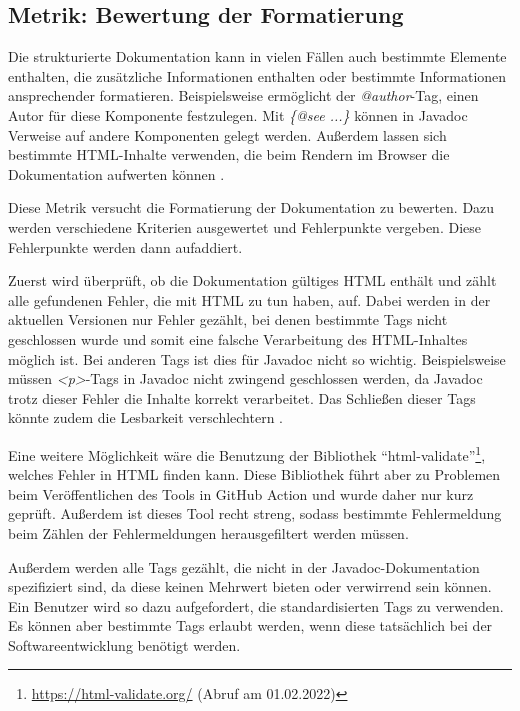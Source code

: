  \subsection{Metrik: Bewertung der Formatierung}\label{chapter:metric_formatting}
 
Die strukturierte Dokumentation kann in vielen Fällen auch bestimmte Elemente enthalten, die zusätzliche Informationen enthalten oder bestimmte Informationen ansprechender formatieren. Beispielsweise ermöglicht der \textit{@author}-Tag, einen Autor für diese Komponente festzulegen. Mit \textit{\{@see ...\}} können in Javadoc Verweise auf andere Komponenten gelegt werden. Außerdem lassen sich bestimmte \ac{HTML}-Inhalte verwenden, die beim Rendern im Browser die Dokumentation aufwerten können \cite{HowtoWriteDocCommentsfortheJavadocTool}. 

Diese Metrik versucht die Formatierung der Dokumentation zu bewerten. Dazu werden verschiedene Kriterien ausgewertet und Fehlerpunkte vergeben. Diese Fehlerpunkte werden dann aufaddiert. 

Zuerst wird überprüft, ob die Dokumentation gültiges \ac{HTML} enthält und zählt alle gefundenen Fehler, die mit HTML zu tun haben, auf.  Dabei werden in der aktuellen Versionen nur Fehler gezählt, bei denen bestimmte Tags nicht geschlossen wurde und somit eine falsche Verarbeitung des HTML-Inhaltes möglich ist. Bei anderen Tags ist dies für Javadoc nicht so wichtig. Beispielsweise müssen \textit{<p>}-Tags in Javadoc nicht zwingend geschlossen werden, da Javadoc trotz dieser Fehler die Inhalte korrekt verarbeitet. Das Schließen dieser Tags könnte zudem die Lesbarkeit verschlechtern  \cite{javadoc_coding_standards}.

Eine weitere Möglichkeit wäre die Benutzung der Bibliothek \enquote{html-validate}\footnote{\href{HTML-Validate}{https://html-validate.org/} (Abruf am 01.02.2022)}, welches Fehler in \ac{HTML} finden kann. Diese Bibliothek führt aber zu Problemen beim Veröffentlichen des Tools in GitHub Action und wurde daher nur kurz geprüft. Außerdem ist dieses Tool recht streng, sodass bestimmte Fehlermeldung beim Zählen der Fehlermeldungen herausgefiltert werden müssen. 

Außerdem werden alle Tags gezählt, die nicht in der Javadoc-Dokumentation spezifiziert sind, da diese keinen Mehrwert  bieten oder verwirrend sein können. Ein Benutzer wird so dazu aufgefordert, die standardisierten Tags zu verwenden. Es können aber bestimmte Tags erlaubt werden, wenn diese tatsächlich bei der Softwareentwicklung benötigt werden.

